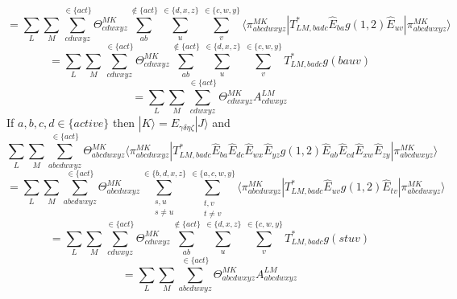 \documentclass[12pt]{article}
\begin{document}
\begin{equation*}
=\sum_{L} \sum_{M}\sum_{cdwxyz}^{\in\{act\}}\Theta^{MK}_{cdwxyz}   \sum_{ab}^{\notin \{act\} } \sum_{u}^{\in\{d,x,z\}}\sum_{v}^{\in\{c,w,y\}}
 \langle \pi^{MK}_{abcdwxyz}|T^{*}_{LM,badc}\hat{E}_{ba}g(1,2)\hat{E}_{uv} |\pi^{MK}_{abcdwxyz}  \rangle
\end{equation*}
\begin{equation*}
=\sum_{L} \sum_{M}\sum_{cdwxyz}^{\in\{act\}}\Theta^{MK}_{cdwxyz}   \sum_{ab}^{\notin \{act\} } \sum_{u}^{\in\{d,x,z\}}\sum_{v}^{\in\{c,w,y\}}T^{*}_{LM,badc}g(bauv)
\end{equation*}
\begin{equation*}
=\sum_{L} \sum_{M}\sum_{cdwxyz}^{\in\{act\}}\Theta^{MK}_{cdwxyz}A^{LM}_{cdwxyz}
\end{equation*}
\noindent If $a,b,c,d \in \{active\} $  then $|K\rangle = E_{\gamma\delta\eta\zeta}|J\rangle$ and  
\begin{equation*}
\sum_{L} \sum_{M} \sum_{abcdwxyz}^{\in\{act\}} 
\Theta^{MK}_{abcdwxyz} \langle \pi^{MK}_{abcdwxyz}|T^{*}_{LM,badc}\hat{E}_{ba}\hat{E}_{dc}\hat{E}_{wx}\hat{E}_{yz}g(1,2)\hat{E}_{ab}\hat{E}_{cd}\hat{E}_{xw}\hat{E}_{zy} |\pi^{MK}_{abcdwxyz}  \rangle
\end{equation*}
\begin{equation*}
=\sum_{L} \sum_{M} \sum_{abcdwxyz}^{\in\{act\}} \Theta^{MK}_{abcdwxyz}\sum_{\substack{s,u\\ s\neq u}}^{\in\{b,d,x,z\}}\sum_{\substack{t,v\\ t\neq v}}^{\in\{a,c,w,y\}}
 \langle \pi^{MK}_{abcdwxyz}|T^{*}_{LM,badc}\hat{E}_{uv}g(1,2)\hat{E}_{tv} |\pi^{MK}_{abcdwxyz}  \rangle
\end{equation*}
\begin{equation*}
=\sum_{L} \sum_{M}\sum_{cdwxyz}^{\in\{act\}}\Theta^{MK}_{cdwxyz}   \sum_{ab}^{\notin \{act\} } \sum_{u}^{\in\{d,x,z\}}\sum_{v}^{\in\{c,w,y\}} T^{*}_{LM,badc}g(stuv)
\end{equation*}
\begin{equation*}
=\sum_{L} \sum_{M}\sum_{abcdwxyz}^{\in\{act\}}\Theta^{MK}_{abcdwxyz}A^{LM}_{abcdwxyz}
\end{equation*}
\end{document}
